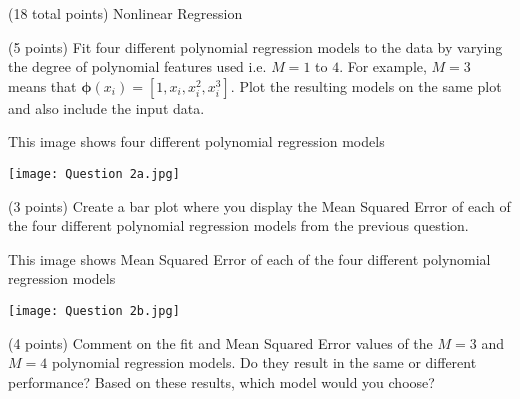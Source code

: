 \documentclass[12pt]{article}
\begin{document}
\begin{question}{(18 total points) Nonlinear Regression}





%
%
\begin{subquestion}{(5 points) Fit four different polynomial regression models to the data  by varying the degree of polynomial features used i.e. $M = 1$ to $4$.
For example, $M=3$ means that $\boldsymbol{\phi}(x_i) = [1, x_i, x_i^2, x_i^3]$.
Plot the resulting models on the same plot and also include the input data.\\
}


\begin{answerbox}{35em}
This image shows four different polynomial regression models
\begin{center}
\texttt{[image: Question 2a.jpg]}
\end{center}
\end{answerbox}



\end{subquestion}


%
%
\begin{subquestion}{(3 points) Create a bar plot where you display the Mean Squared Error of each of the four different polynomial regression models from the previous question.}


\begin{answerbox}{35em}
This image shows  Mean Squared Error of each of the four different polynomial regression models
\begin{center}
\texttt{[image: Question 2b.jpg]}
\end{center}
\end{answerbox}



\end{subquestion}


%
%
\begin{subquestion}{(4 points) Comment on the fit and Mean Squared Error values of the $M=3$ and $M=4$ polynomial regression models. 
Do they result in the same or different performance? 
Based on these results, which model would you choose?}



\end{subquestion}
\end{question}
\end{document}

